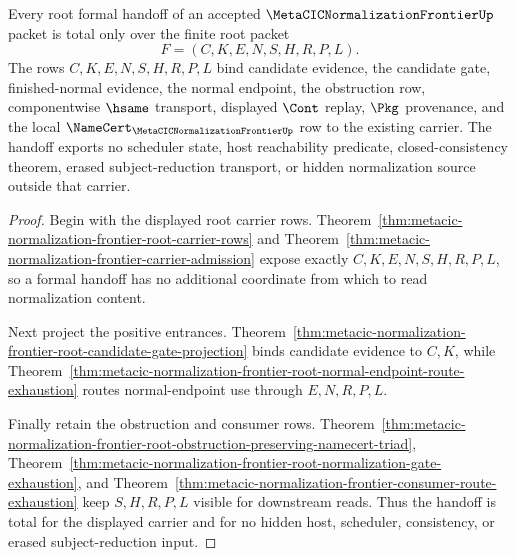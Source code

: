 \begin{theorem}
\label{thm:metacic-normalization-frontier-root-formal-handoff-totality}
Every root formal handoff of an accepted $\MetaCICNormalizationFrontierUp$ packet is total only over the finite root packet
$$
F=(C,K,E,N,S,H,R,P,L).
$$
The rows $C,K,E,N,S,H,R,P,L$ bind candidate evidence, the candidate gate, finished-normal evidence, the normal endpoint, the obstruction row, componentwise $\hsame$ transport, displayed $\Cont$ replay, $\Pkg$ provenance, and the local $\NameCert_{\MetaCICNormalizationFrontierUp}$ row to the existing carrier. The handoff exports no scheduler state, host reachability predicate, closed-consistency theorem, erased subject-reduction transport, or hidden normalization source outside that carrier.
\end{theorem}
\begin{proof}
Begin with the displayed root carrier rows. Theorem~\ref{thm:metacic-normalization-frontier-root-carrier-rows} and Theorem~\ref{thm:metacic-normalization-frontier-carrier-admission} expose exactly $C,K,E,N,S,H,R,P,L$, so a formal handoff has no additional coordinate from which to read normalization content.

Next project the positive entrances. Theorem~\ref{thm:metacic-normalization-frontier-root-candidate-gate-projection} binds candidate evidence to $C,K$, while Theorem~\ref{thm:metacic-normalization-frontier-root-normal-endpoint-route-exhaustion} routes normal-endpoint use through $E,N,R,P,L$.

Finally retain the obstruction and consumer rows. Theorem~\ref{thm:metacic-normalization-frontier-root-obstruction-preserving-namecert-triad}, Theorem~\ref{thm:metacic-normalization-frontier-root-normalization-gate-exhaustion}, and Theorem~\ref{thm:metacic-normalization-frontier-consumer-route-exhaustion} keep $S,H,R,P,L$ visible for downstream reads. Thus the handoff is total for the displayed carrier and for no hidden host, scheduler, consistency, or erased subject-reduction input.
\end{proof}

